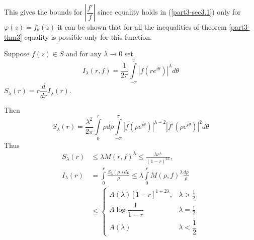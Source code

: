 This gives the bounds for $\left|\dfrac{f'}{f}\right|$ since equality holds in
(\ref{part3-sec3.1}) only for $\varphi(z)=f_{\theta}(z)$ it can be
shown that for all the inequalities of theorem \ref{part3-thm3}
equality is possible only for this function. 

\begin{thm}\label{part3-thm4}
Suppose $f(z)\in S$ and for any $\lambda\to 0$ set
\begin{equation*}
I_{\lambda}(r,f)=\frac{1}{2\pi}\int\limits^{\pi}_{-\pi}|f(re^{i\theta})|^{\lambda}d\theta\tag{3.2}\label{part3-eq3.2}
\end{equation*}
$S_{\lambda}(r)=r\dfrac{d}{dr}I_{\lambda}(r)$.
\end{thm}

Then 
\begin{equation*}
S_{\lambda}(r)=\frac{\lambda^{2}}{2\pi}\int\limits^{r}_{0}\rho d\rho
\int\limits^{\pi}_{-\pi}|f(\rho e^{i\theta})|^{\lambda-2}|f'(\rho
e^{i\theta})|^{2}d\theta \tag{3.3}\label{part3-eq3.3}
\end{equation*}
Thus
\begin{align*}
S_{\lambda}(r) &\leq \lambda M(r,f)^{\lambda}\leq \frac{\lambda
  r^{\lambda}}{(1-r)^{2\lambda}},\tag{3.4}\label{part3-eq3.4}\\
I_{\lambda}(r) &=
\int\limits^{r}_{0}\frac{S_{\lambda}(\rho)d\rho}{\rho}\leq \lambda
\int\limits^{r}_{0}M(\rho,f)^{\lambda}\frac{d\rho}{\rho}\\
&\leq 
\begin{cases}
A(\lambda)[1-r]^{1-2\lambda}, & \lambda>\frac{1}{2}\\
A\log\dfrac{1}{1-r} & \lambda=\frac{1}{2}\\
A(\lambda) & \lambda<\dfrac{1}{2}
\end{cases}\tag{3.5}\label{part3-eq3.5}
\end{align*}\pageoriginale

